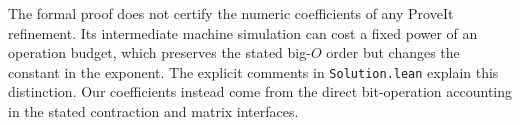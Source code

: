 The formal proof does not certify the numeric coefficients of any ProveIt
refinement. Its intermediate machine simulation can cost a fixed power of
an operation budget, which preserves the stated big-$O$ order but changes
the constant in the exponent. The explicit comments in
\texttt{Solution.lean} explain this distinction. Our coefficients instead
come from the direct bit-operation accounting in the stated contraction
and matrix interfaces.

